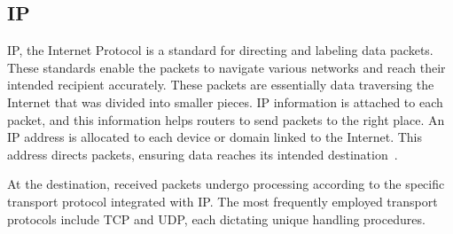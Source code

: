 \subsection{IP}
\label{sub:ip}

IP, the Internet Protocol is a standard for directing and labeling data packets. These standards enable the packets to navigate various networks and reach their intended recipient accurately. These packets are essentially data traversing the Internet that was divided into smaller pieces. IP information is attached to each packet, and this information helps routers to send packets to the right place. An IP address is allocated to each device or domain linked to the Internet. This address directs packets, ensuring data reaches its intended destination~\cite{ip2024}.

At the destination, received packets undergo processing according to the specific transport protocol integrated with IP. The most frequently employed transport protocols include TCP and UDP, each dictating unique handling procedures.

